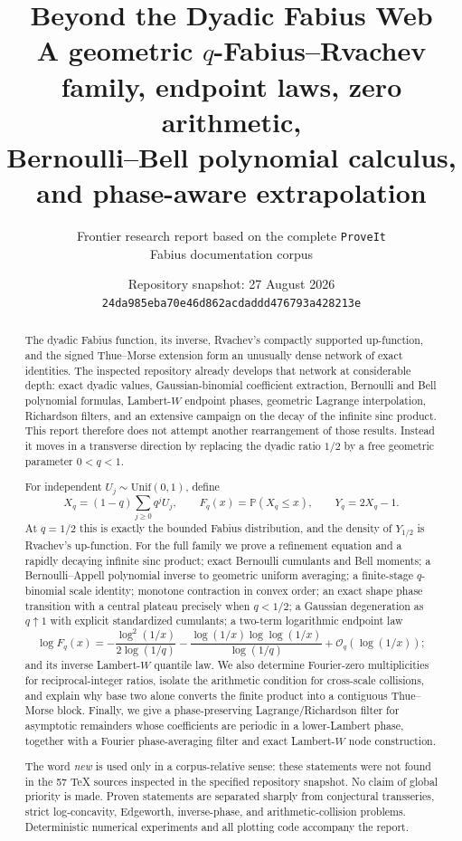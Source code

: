 \documentclass[11pt,oneside]{article}
\title{\bfseries Beyond the Dyadic Fabius Web\\[0.35em]
\large A geometric $q$-Fabius--Rvachev family, endpoint laws, zero arithmetic,\\
Bernoulli--Bell polynomial calculus, and phase-aware extrapolation}
\author{\small Frontier research report based on the complete \texttt{ProveIt}\\Fabius documentation corpus}
\date{Repository snapshot: 27 August 2026\\
\small \texttt{24da985eba70e46d862acdaddd476793a428213e}}
\theoremstyle{definition}
\theoremstyle{remark}
\newcommand{\Prob}{\mathbb P}
\newcommand{\bigO}{\mathcal O}
\begin{document}
\maketitle

\begin{abstract}
The dyadic Fabius function, its inverse, Rvachev's compactly supported up-function,
and the signed Thue--Morse extension form an unusually dense network of exact identities.
The inspected repository already develops that network at considerable depth: exact dyadic
values, Gaussian-binomial coefficient extraction, Bernoulli and Bell polynomial formulas,
Lambert-$W$ endpoint phases, geometric Lagrange interpolation, Richardson filters, and an
extensive campaign on the decay of the infinite sinc product.  This report therefore does
not attempt another rearrangement of those results.  Instead it moves in a transverse
direction by replacing the dyadic ratio $1/2$ by a free geometric parameter $0<q<1$.

For independent $U_j\sim\mathrm{Unif}(0,1)$, define
\[
 X_q=(1-q)\sum_{j\ge0}q^jU_j,
 \qquad F_q(x)=\Prob(X_q\le x),
 \qquad Y_q=2X_q-1.
\]
At $q=1/2$ this is exactly the bounded Fabius distribution, and the density of $Y_{1/2}$
is Rvachev's up-function.  For the full family we prove a refinement equation and a
rapidly decaying infinite sinc product; exact Bernoulli cumulants and Bell moments; a
Bernoulli--Appell polynomial inverse to geometric uniform averaging; a finite-stage
$q$-binomial scale identity; monotone contraction in convex order; an exact shape phase
transition with a central plateau precisely when $q<1/2$; a Gaussian degeneration as
$q\uparrow1$ with explicit standardized cumulants; a two-term logarithmic endpoint law
\[
 \log F_q(x)
 =-\frac{\log^2(1/x)}{2\log(1/q)}
  -\frac{\log(1/x)\log\log(1/x)}{\log(1/q)}
  +\bigO_q(\log(1/x));
\]
and its inverse Lambert-$W$ quantile law.  We also determine Fourier-zero multiplicities
for reciprocal-integer ratios, isolate the arithmetic condition for cross-scale collisions,
and explain why base two alone converts the finite product into a contiguous Thue--Morse
block.  Finally, we give a phase-preserving Lagrange/Richardson filter for asymptotic
remainders whose coefficients are periodic in a lower-Lambert phase, together with a
Fourier phase-averaging filter and exact Lambert-$W$ node construction.

The word \emph{new} is used only in a corpus-relative sense: these statements were not found
in the 57 TeX sources inspected in the specified repository snapshot.  No claim of global
priority is made.  Proven statements are separated sharply from conjectural transseries,
strict log-concavity, Edgeworth, inverse-phase, and arithmetic-collision problems.
Deterministic numerical experiments and all plotting code accompany the report.
\end{abstract}
\end{document}
